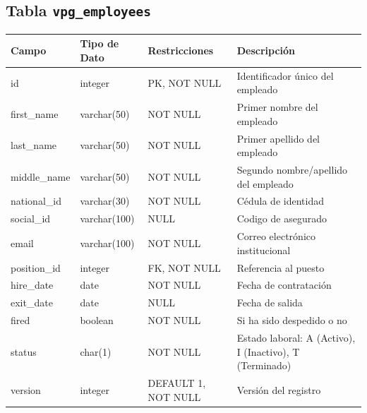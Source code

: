 \begin{center}
	\subsection{Tabla \texttt{vpg\_employees}}
	\small
	\begin{tabular}{|l|l|l|p{6cm}|}
		\hline
		\textbf{Campo} & \textbf{Tipo de Dato} & \textbf{Restricciones} & \textbf{Descripción}                                    \\
		\hline
		id             & integer               & PK, NOT NULL           & Identificador único del empleado                        \\
		first\_name    & varchar(50)           & NOT NULL               & Primer nombre del empleado                              \\
		last\_name     & varchar(50)           & NOT NULL               & Primer apellido del empleado                            \\
		middle\_name   & varchar(50)           & NOT NULL               & Segundo nombre/apellido del empleado                    \\
		national\_id   & varchar(30)           & NOT NULL               & Cédula de identidad                                     \\
		social\_id     & varchar(100)          & NULL                   & Codigo de asegurado                                     \\
		email          & varchar(100)          & NOT NULL               & Correo electrónico institucional                        \\
		position\_id   & integer               & FK, NOT NULL           & Referencia al puesto                                    \\
		hire\_date     & date                  & NOT NULL               & Fecha de contratación                                   \\
		exit\_date     & date                  & NULL                   & Fecha de salida                                         \\
		fired          & boolean               & NOT NULL               & Si ha sido despedido o no                               \\
		status         & char(1)               & NOT NULL               & Estado laboral: A (Activo), I (Inactivo), T (Terminado) \\
		version        & integer               & DEFAULT 1, NOT NULL    & Versión del registro                                    \\
		\hline
	\end{tabular}
	\normalsize


\end{center}
